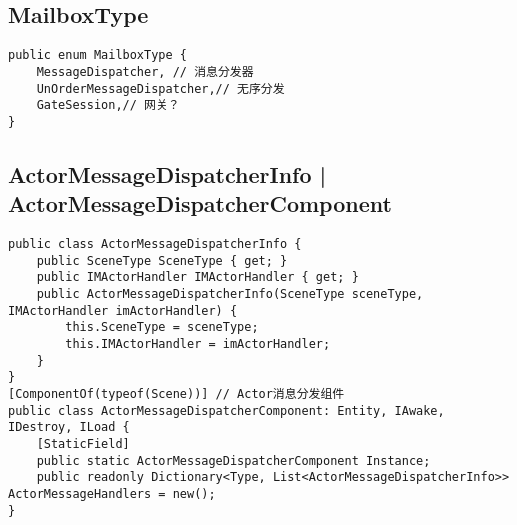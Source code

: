 \documentclass[9pt, b5paper]{article}
\begin{document}
\subsection{MailboxType}
\label{sec-8-11}
\begin{verbatim}
public enum MailboxType {
    MessageDispatcher, // 消息分发器
    UnOrderMessageDispatcher,// 无序分发
    GateSession,// 网关？
}
\end{verbatim}

\subsection{ActorMessageDispatcherInfo | ActorMessageDispatcherComponent}
\label{sec-8-12}
\begin{verbatim}
public class ActorMessageDispatcherInfo {
    public SceneType SceneType { get; }
    public IMActorHandler IMActorHandler { get; }
    public ActorMessageDispatcherInfo(SceneType sceneType, IMActorHandler imActorHandler) {
        this.SceneType = sceneType;
        this.IMActorHandler = imActorHandler;
    }
}
[ComponentOf(typeof(Scene))] // Actor消息分发组件
public class ActorMessageDispatcherComponent: Entity, IAwake, IDestroy, ILoad {
    [StaticField]
    public static ActorMessageDispatcherComponent Instance;
    public readonly Dictionary<Type, List<ActorMessageDispatcherInfo>> ActorMessageHandlers = new();
}
\end{verbatim}
\end{document}
